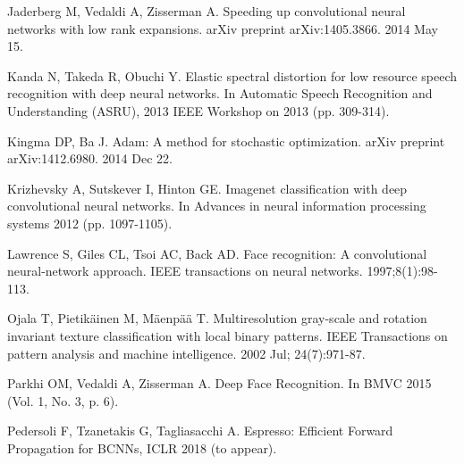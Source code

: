 \documentclass[conference,compsoc]{IEEEtran}
\begin{document}
\begin{thebibliography}{99}
\bibitem{}
Jaderberg M, Vedaldi A, Zisserman A. Speeding up convolutional neural networks with low rank expansions. arXiv preprint arXiv:1405.3866. 2014 May 15.
\label{refSepConv}

\bibitem{}
Kanda N, Takeda R, Obuchi Y. Elastic spectral distortion for low resource speech recognition with deep neural networks. In Automatic Speech Recognition and Understanding (ASRU), 2013 IEEE Workshop on 2013 (pp. 309-314).
\label{audioclassification2}


\bibitem{}
Kingma DP, Ba J. Adam: A method for stochastic optimization. arXiv preprint arXiv:1412.6980. 2014 Dec 22.
\label{refAdam}

\bibitem{}
Krizhevsky A, Sutskever I, Hinton GE. Imagenet classification with deep convolutional neural networks. In Advances in neural information processing systems 2012 (pp. 1097-1105).
\label{imageclassification}

\bibitem{}
Lawrence S, Giles CL, Tsoi AC, Back AD. Face recognition: A convolutional neural-network approach. IEEE transactions on neural networks. 1997;8(1):98-113.
\label{facerecognition1}



 

\bibitem{}
Ojala T, Pietik\"ainen M, M\"aenp\"a\"a T. Multiresolution gray-scale and rotation invariant texture classification with local binary patterns. IEEE Transactions on pattern analysis and machine intelligence. 2002 Jul; 24(7):971-87.
\label{refLBP}

\bibitem{}
Parkhi OM, Vedaldi A, Zisserman A. Deep Face Recognition. In BMVC 2015 (Vol. 1, No. 3, p. 6).
\label{facerecognition2}

\bibitem{}
Pedersoli F, Tzanetakis G, Tagliasacchi A. Espresso: Efficient Forward Propagation for BCNNs, ICLR 2018 (to appear).
\label{refBinGPU}



\end{thebibliography}
\end{document}
